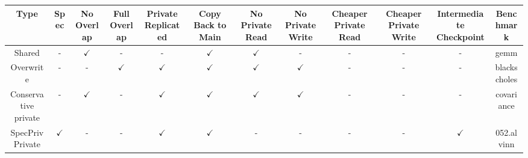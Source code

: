 \centering
\tiny
\begin{tabular}{|c|c|c|c|c|c|c|c|c|c|c|c|}
  \hline
  Type &
  Spec &
  No Overlap &
  Full Overlap &
  Private Replicated &
  Copy Back to Main &
  No Private Read &
  No Private Write &
  Cheaper Private Read &
  Cheaper Private Write &
  Intermediate Checkpoint &
  \textbf{Benchmark} \\

 \hline
 Shared & - & $\checkmark$ & - & - & $\checkmark$ & $\checkmark$ & - & - & - &
 - & gemm \\
 \hline
 \hline
 Overwrite & - & - & $\checkmark$ & $\checkmark$ & $\checkmark$ &
 $\checkmark$ & $\checkmark$ & - & - & - & blackscholes \\
 \hline
 Conservative private & - & $\checkmark$ & - & $\checkmark$ &
 $\checkmark$ & $\checkmark$ & $\checkmark$ & - & - & - & covariance \\
 \hline
 SpecPriv Private & $\checkmark$ & - & - & $\checkmark$ &
 $\checkmark$ & - & - & - & - & $\checkmark$ & 052.alvinn \\
 \hline
\end{tabular}

